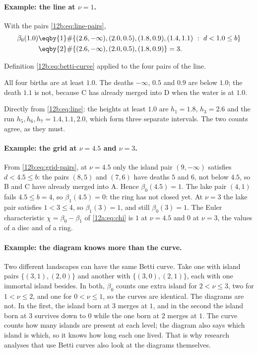 \paragraph{Example: the line at $\nu=1$.} With the pairs \eqref{12b:eq:line-pairs},
\begin{align*}
  \beta_0(1.0)
  &\eqby{1}\#\{(2.6,-\infty),(2.0,0.5),(1.8,0.9),(1.4,1.1)\ :\ d<1.0\leq b\}\\
  &\eqby{2}\#\{(2.6,-\infty),(2.0,0.5),(1.8,0.9)\}
  = 3 .
\end{align*}
\begin{explain}
  \item Definition \eqref{12b:eq:betti-curve} applied to the four pairs of the line.
  \item All four births are at least $1.0$. The deaths $-\infty$, $0.5$ and $0.9$ are below $1.0$; the death $1.1$
        is not, because C has already merged into D when the water is at $1.0$.
\end{explain}
Directly from \eqref{12b:eq:line}: the heights at least $1.0$ are $h_1=1.8$, $h_3=2.6$ and the run $h_5,h_6,h_7=
1.4,1.1,2.0$, which form three separate intervals. The two counts agree, as they must.

\paragraph{Example: the grid at $\nu=4.5$ and $\nu=3$.} From \eqref{12b:eq:grid-pairs}, at $\nu=4.5$ only the
island pair $(9,-\infty)$ satisfies $d<4.5\leq b$: the pairs $(8,5)$ and $(7,6)$ have deaths $5$ and $6$, not
below $4.5$, so B and C have already merged into A. Hence $\beta_0(4.5)=1$. The lake pair $(4,1)$ fails
$4.5\leq b=4$, so $\beta_1(4.5)=0$: the ring has not closed yet. At $\nu=3$ the lake pair satisfies $1<3\leq4$,
so $\beta_1(3)=1$, and still $\beta_0(3)=1$. The Euler characteristic $\chi=\beta_0-\beta_1$ of
\cref{12a:eq:chi} is $1$ at $\nu=4.5$ and $0$ at $\nu=3$, the values of a disc and of a ring.

\paragraph{Example: the diagram knows more than the curve.} Two different landscapes can have the same Betti curve.
Take one with island pairs $\{(3,1),(2,0)\}$ and another with $\{(3,0),(2,1)\}$, each with one immortal island
besides. In both, $\beta_0$ counts one extra island for $2<\nu\leq3$, two for $1<\nu\leq2$, and one for
$0<\nu\leq1$, so the curves are identical. The diagrams are not. In the first, the island born at $3$ merges
at $1$, and in the second the island born at $3$ survives down to $0$ while the one born at $2$ merges at $1$.
The curve counts how many islands are present at each level; the diagram also says which island is which, so
it knows how long each one lived. That is why research analyses that use Betti curves
\cite{Pranav2017,Wilding2021} also look at the diagrams themselves.

